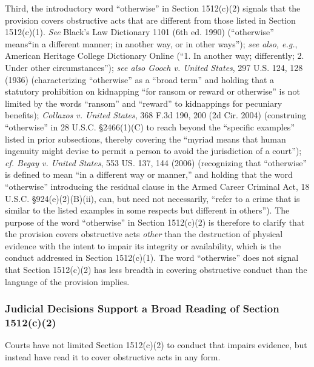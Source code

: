 Third, the introductory word “otherwise” in Section 1512(c)(2) signals that the provision covers obstructive acts that are different from those listed in Section 1512(c)(1).
\textit{See} Black’s Law Dictionary 1101 (6th ed. 1990) (“otherwise” means“in a different manner; in another way, or in other ways”);
\textit{see also, e.g.}, American Heritage College Dictionary Online (“1. In another way; differently; 2. Under other circumstances”);
\textit{see also Gooch v. United States}, 297 U.S. 124, 128 (1936) (characterizing “otherwise” as a “broad term” and holding that a statutory prohibition on kidnapping “for ransom or reward or otherwise” is not limited by the words “ransom” and “reward” to kidnappings for pecuniary benefits);
\textit{Collazos v. United States}, 368 F.3d 190, 200 (2d Cir. 2004) (construing “otherwise” in 28 U.S.C. \S 2466(1)(C) to reach beyond the “specific examples” listed in prior subsections, thereby covering the “myriad means that human ingenuity might devise to permit a person to avoid the jurisdiction of a court”);
\textit{cf. Begay v. United States}, 553 US. 137, 144 (2006) (recognizing that “otherwise” is defined to mean “in a different way or manner,” and holding that the word “otherwise” introducing the residual clause in the Armed Career Criminal Act, 18 U.S.C. \S 924(e)(2)(B)(ii), can, but need not necessarily, “refer to a crime that is similar to the listed examples in some respects but different in others”).%
The purpose of the word “otherwise” in Section 1512(c)(2) is therefore to clarify that the provision covers obstructive acts \textit{other} than the destruction of physical evidence with the intent to impair its integrity or availability, which is the conduct addressed in Section 1512(c)(1).
The word “otherwise” does not signal that Section 1512(c)(2) has less breadth in covering obstructive conduct than the language of the provision implies.

\subsubsection{Judicial Decisions Support a Broad Reading of Section 1512(c)(2)}

Courts have not limited Section 1512(c)(2) to conduct that impairs evidence, but instead have read it to cover obstructive acts in any form.

